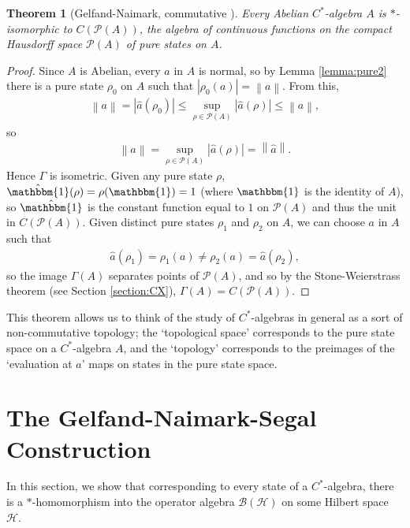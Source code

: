 \documentclass[11pt,a4paper]{report}
\theoremstyle{plain}
\newtheorem{thm}{Theorem}
\theoremstyle{definition}
\newcommand{\1}{\mathbbm{1}}
\renewcommand{\H}{\mathcal{H}}
\newcommand{\B}{\mathcal{B}}
\renewcommand{\P}[1]{\mathscr{P}(#1)}
\begin{document}
\begin{thm}[{Gelfand-Naimark, commutative \cite[4.4.3]{kadison83}}] \label{thm:gnc}
	Every Abelian $C^\ast$-algebra $A$ is $\ast$-isomorphic to $C(\P A)$, the 
	algebra of continuous functions on the compact Hausdorff space $\P A$ of pure 
	states on $A$.

\end{thm}
\begin{proof}
	Since $A$ is Abelian, every $a$ in $A$ is normal, so by Lemma \ref{lemma:pure2} 
	there is a pure state $\rho_0$ on $A$ such that $|\rho_0(a)|=\left\|a\right\|$. 
	From this, 
	\begin{align*}
		\left\|a\right\|	=|\hat a(\rho_0)|\leq \sup_{\rho\in\P A}|\hat a(\rho)| 
							\leq \left\|a\right\|,
	\end{align*}
	so 
	\begin{align*}
		\left\|a\right\|=\sup_{\rho\in\P A} |\hat a (\rho)| = \left\|\hat a\right\|.
	\end{align*}
	Hence $\Gamma$ is isometric.
	Given any pure state $\rho$, $\hat \1(\rho) = \rho(\1) = 1$ (where $\1$ is the 
	identity of $A$), so $\hat\1$ is the constant function equal to $1$ on $\P A$ 
	and thus the unit in $C(\P A)$. Given distinct pure states $\rho_1$ and $\rho_2$ 
	on $A$, we can choose $a$ in $A$ such that 
	\begin{align*}
		\hat a(\rho_1) = \rho_1(a) \not= \rho_2(a) = \hat a(\rho_2),
	\end{align*}
	so the image $\Gamma(A)$ separates points of $\P A$, and so by the 
	Stone-Weierstrass theorem (see Section \ref{section:CX}), $\Gamma(A)=C(\P A)$.

\end{proof}

This theorem allows us to think of the study of $C^\ast$-algebras in general as 
a sort of non-commutative topology; the `topological space' corresponds to the 
pure state space on a $C^\ast$-algebra $A$, and the `topology' corresponds to 
the preimages of the `evaluation at $a$' maps on states in the pure state space.



	
\section{The Gelfand-Naimark-Segal Construction}
In this section, we show that corresponding to every state of a 
$C^\ast$-algebra, there is a $\ast$-homomorphism into the operator algebra 
$\B(\H)$ on some Hilbert space $\H$. 
\end{document}
